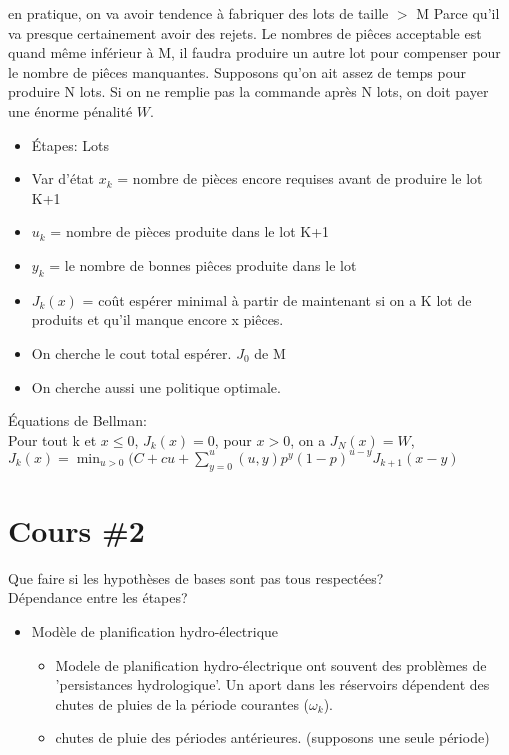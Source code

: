 \documentclass[oneside]{book}
\begin{document}
en pratique, on va avoir tendence à fabriquer des lots de taille $>$ M Parce qu'il va presque certainement avoir des rejets. Le nombres de piêces acceptable est quand même inférieur à M, il faudra produire un autre lot pour compenser pour le nombre de piêces manquantes. Supposons qu'on ait assez de temps pour produire N lots. Si on ne remplie pas la commande après N lots, on doit payer une énorme pénalité $W$. \\

\begin{itemize}
\item Étapes:  Lots
\item Var d'état $x_k$ = nombre de pièces encore requises avant de produire le lot K+1
\item $u_k$ = nombre de pièces produite dans le lot K+1
\item $y_k$ = le nombre de bonnes piêces produite dans le lot
\item $J_k(x)$ = coût espérer minimal à partir de maintenant si on a K lot de produits et qu'il manque encore x piêces. 
\item On cherche le cout total espérer. $J_0$ de M
\item On cherche aussi une politique optimale.
\end{itemize}

Équations de Bellman:\\

Pour tout k et $x \leq 0$, $J_k(x) = 0$, pour $x > 0$, on a $J_N(x) = W$, $J_k(x) = \min_{u>0}(C + cu + \sum\limits_{y = 0}^u(u,y)p^y(1-p)^{u-y}J_{k+1}(x-y)$


\chapter{Cours \#2}
Que faire si les hypothèses de bases sont pas tous respectées?\\

Dépendance entre les étapes? 

\begin{itemize}
\item Modèle de planification hydro-électrique
\begin{itemize}
\item Modele de planification hydro-électrique ont souvent des problèmes de 'persistances hydrologique'. Un aport dans les réservoirs dépendent des chutes de pluies de la période courantes ($\omega_k$). 
\item chutes de pluie des périodes antérieures. (supposons une seule période)
\end{itemize}
\end{itemize}
\end{document}
